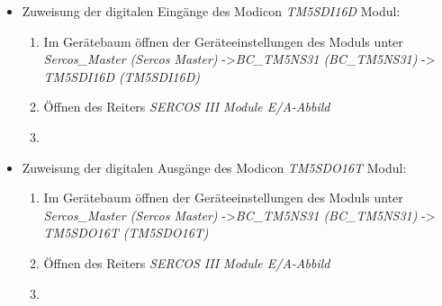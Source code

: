 \documentclass[../../../Bachelorarbeit.tex]{subfiles}
\begin{document}
\begin{itemize}
    \item Zuweisung der digitalen Eingänge des Modicon \textit{TM5SDI16D} Modul:
    \begin{enumerate}
        \item Im Gerätebaum öffnen der Geräteeinstellungen des Moduls unter \textit{Sercos\_Master (Sercos Master)} ->\small \textit{BC\_TM5NS31 (BC\_TM5NS31)} -> \textit{TM5SDI16D (TM5SDI16D)}
        \item \normalsize Öffnen des Reiters \textit{SERCOS III Module E/A-Abbild}
        \item \begin{minipage}[t]{\linewidth}
            \raggedright
            \label{fig:my-img26}
        \end{minipage}
    \end{enumerate}
    \item Zuweisung der digitalen Ausgänge des Modicon \textit{TM5SDO16T} Modul:
    \begin{enumerate}
        \item Im Gerätebaum öffnen der Geräteeinstellungen des Moduls unter \textit{Sercos\_Master (Sercos Master)} ->\small \textit{BC\_TM5NS31 (BC\_TM5NS31)} -> \textit{TM5SDO16T (TM5SDO16T)}
        \item \normalsize Öffnen des Reiters \textit{SERCOS III Module E/A-Abbild}
        \item \begin{minipage}[t]{\linewidth}
            \raggedright
\end{minipage}
\end{enumerate}
\end{itemize}
\end{document}
